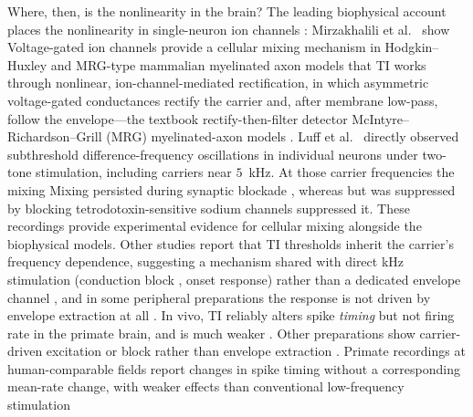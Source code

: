 \documentclass[11pt,a4paper]{article}
\providecommand{\DIFaddtex}[1]{{\protect\color{blue} \sf #1}} %
\providecommand{\DIFdeltex}[1]{{\protect\color{red} \scriptsize #1}} %
\providecommand{\DIFaddbegin}{} %
\providecommand{\DIFaddend}{} %
\providecommand{\DIFdelbegin}{} %
\providecommand{\DIFdelend}{} %
\providecommand{\DIFadd}[1]{\texorpdfstring{\DIFaddtex{#1}}{#1}} %
\providecommand{\DIFdel}[1]{\texorpdfstring{\DIFdeltex{#1}}{}} %
\begin{document}
\DIFdelbegin \DIFdel{Where, then, is the nonlinearity in the brain?  The leading biophysical account
places the nonlinearity in single-neuron ion channels : Mirzakhalili et al.\
\cite{mirzakhalili2020} show }\DIFdelend \DIFaddbegin \DIFadd{Voltage-gated ion channels provide a cellular mixing mechanism }\DIFaddend in Hodgkin--Huxley
and \DIFdelbegin \DIFdel{MRG-type mammalian myelinated
axon models that TI works through nonlinear, ion-channel-mediated rectification, in which
asymmetric voltage-gated conductances rectify the carrier and, after membrane
low-pass, follow the envelope---the textbook rectify-then-filter detector}\DIFdelend \DIFaddbegin \DIFadd{McIntyre--Richardson--Grill (MRG) myelinated-axon models \cite{mirzakhalili2020}}\DIFaddend .
Luff et al.\ \cite{luff2024mixer} directly observed subthreshold difference-frequency
oscillations in individual neurons\DIFdelbegin \DIFdel{under two-tone stimulation}\DIFdelend , including carriers near $5$~kHz. \DIFdelbegin \DIFdel{At those carrier frequencies the mixing }\DIFdelend \DIFaddbegin \DIFadd{Mixing }\DIFaddend persisted
during synaptic blockade \DIFdelbegin \DIFdel{,
whereas }\DIFdelend \DIFaddbegin \DIFadd{but was suppressed by }\DIFaddend blocking tetrodotoxin-sensitive sodium
channels\DIFdelbegin \DIFdel{suppressed it. These recordings
provide experimental evidence for cellular mixing alongside the biophysical models.
Other studies report that TI thresholds inherit the carrier's frequency dependence,
suggesting a mechanism shared with direct kHz stimulation (conduction block ,
onset response) rather than
a dedicated envelope channel
\cite{opancar2025,peripheral2023}, and in some peripheral preparations the
response is not driven by envelope extraction at all \cite{peripheral2023}. In
vivo, TI reliably alters spike \emph{timing} but not firing rate in the primate
brain, and is much weaker }\DIFdelend \DIFaddbegin \DIFadd{. Other preparations show carrier-driven excitation or block rather }\DIFaddend than
\DIFaddbegin \DIFadd{envelope extraction \cite{opancar2025,peripheral2023,semenov2025}. Primate recordings at
human-comparable fields report changes in spike timing without a corresponding
mean-rate change, with weaker effects than }\DIFaddend conventional low-frequency stimulation
\end{document}
